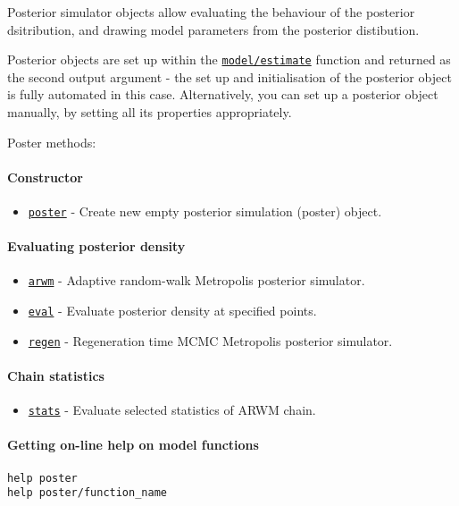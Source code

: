 

	Posterior simulator objects allow evaluating the behaviour of the
posterior dsitribution, and drawing model parameters from the posterior
distibution.

Posterior objects are set up within the
\href{model/estimate}{\texttt{model/estimate}} function and returned as
the second output argument - the set up and initialisation of the
posterior object is fully automated in this case. Alternatively, you can
set up a posterior object manually, by setting all its properties
appropriately.

Poster methods:

\paragraph{Constructor}

\begin{itemize}
\itemsep1pt\parskip0pt
\item
  \href{poster/poster}{\texttt{poster}} - Create new empty posterior
  simulation (poster) object.
\end{itemize}

\paragraph{Evaluating posterior
density}

\begin{itemize}
\itemsep1pt\parskip0pt
\item
  \href{poster/arwm}{\texttt{arwm}} - Adaptive random-walk Metropolis
  posterior simulator.
\item
  \href{poster/eval}{\texttt{eval}} - Evaluate posterior density at
  specified points.
\item
  \href{poster/regen}{\texttt{regen}} - Regeneration time MCMC
  Metropolis posterior simulator.
\end{itemize}

\paragraph{Chain statistics}

\begin{itemize}
\itemsep1pt\parskip0pt
\item
  \href{poster/stats}{\texttt{stats}} - Evaluate selected statistics of
  ARWM chain.
\end{itemize}

\paragraph{Getting on-line help on model
functions}

\begin{verbatim}
help poster
help poster/function_name
\end{verbatim}



